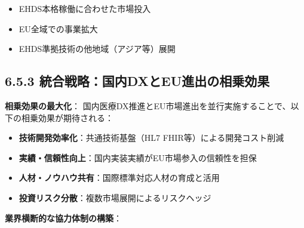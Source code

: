 \documentclass[
  a4paper,
  a4paper,
  11pt]{ltjsbook}
\providecommand{\tightlist}{%
  \setlength{\itemsep}{0pt}\setlength{\parskip}{0pt}}
\begin{document}
\begin{itemize}
\tightlist
\item
  EHDS本格稼働に合わせた市場投入
\item
  EU全域での事業拡大
\item
  EHDS準拠技術の他地域（アジア等）展開
\end{itemize}

\subsection{6.5.3
統合戦略：国内DXとEU進出の相乗効果}\label{ux7d71ux5408ux6226ux7565ux56fdux5185dxux3068euux9032ux51faux306eux76f8ux4e57ux52b9ux679c}

\begin{tcolorbox}[enhanced jigsaw, toprule=.15mm, bottomtitle=1mm, coltitle=black, left=2mm, opacityback=0, arc=.35mm, colbacktitle=quarto-callout-tip-color!10!white, colback=white, opacitybacktitle=0.6, bottomrule=.15mm, rightrule=.15mm, breakable, title=\textcolor{quarto-callout-tip-color}{\faLightbulb}\hspace{0.5em}{Tip}, toptitle=1mm, titlerule=0mm, colframe=quarto-callout-tip-color-frame, leftrule=.75mm]

\textbf{相乗効果の最大化}：
国内医療DX推進とEU市場進出を並行実施することで、以下の相乗効果が期待される：

\begin{itemize}
\tightlist
\item
  \textbf{技術開発効率化}：共通技術基盤（HL7
  FHIR等）による開発コスト削減
\item
  \textbf{実績・信頼性向上}：国内実装実績がEU市場参入の信頼性を担保
\item
  \textbf{人材・ノウハウ共有}：国際標準対応人材の育成と活用
\item
  \textbf{投資リスク分散}：複数市場展開によるリスクヘッジ
\end{itemize}

\end{tcolorbox}

\textbf{業界横断的な協力体制の構築}：
\end{document}

